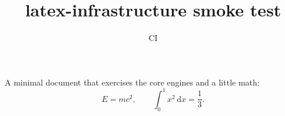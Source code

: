 \documentclass{article}
\title{latex-infrastructure smoke test}
\author{CI}
\begin{document}
\maketitle

A minimal document that exercises the core engines and a little math:
\[
  E = mc^2, \qquad \int_0^1 x^2 \, \mathrm{d}x = \frac{1}{3}.
\]
\end{document}
